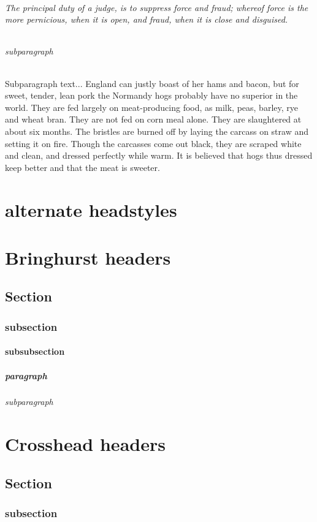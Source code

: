 \documentclass[a4paper, 12pt]{memoir}
\begin{document}
\subparagraph*{ The principal duty of a judge, is to suppress force and fraud; whereof force is the more pernicious, when it is open, and fraud, when it is close and disguised. }
\subparagraph*{subparagraph} 
Subparagraph text... England can justly boast of her hams and bacon, but for sweet, tender, lean pork the Normandy hogs probably have no superior in the world. They are fed largely on meat-producing food, as milk, peas, barley, rye and wheat bran. They are not fed on corn meal alone. They are slaughtered at about six months. The bristles are burned off by laying the carcass on straw and setting it on fire. Though the carcasses come out black, they are scraped white and clean, and dressed perfectly while warm. It is believed that hogs thus dressed keep better and that the meat is sweeter.



\chapter*{ alternate headstyles }
 
\chapter*{ Bringhurst headers } 
\section*{Section}
\subsection*{subsection }
\subsubsection*{subsubsection} 
\paragraph*{paragraph} 
\subparagraph*{subparagraph} 

\chapter*{ Crosshead headers } 
\section*{ Section }
\subsection*{subsection }
\end{document}
